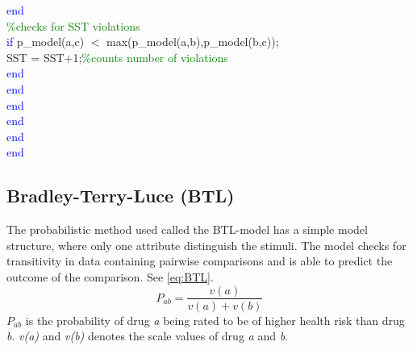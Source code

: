 {\hspace{1mm}\indent \indent \indent \indent \indent \indent \indent \textcolor{blue}{end} \\ 
\hspace{1mm}\indent \indent \indent \indent \indent\indent \indent \indent \textcolor{green}{\%checks for SST violations }\\ 
\hspace{1mm}\indent \indent \indent \indent \indent \indent \indent \indent \textcolor{blue}{if} p\_model(a,c) $<$ max(p\_model(a,b),p\_model(b,c)); \\ 
\hspace{1mm}\indent \indent \indent \indent \indent \indent \indent \indent \indent SST = SST+1;\textcolor{green}{\%counts number of violations }\\ 
\hspace{1mm}\indent \indent \indent \indent \indent \indent \indent \indent \textcolor{blue}{end} \\ 
\hspace{1mm}\indent \indent \indent \indent \indent \indent \indent \textcolor{blue}{end} \\ 
\hspace{1mm}\indent \indent \indent \indent \indent \indent \textcolor{blue}{end} \\ 
\hspace{1mm}\indent \indent \indent \indent \indent \textcolor{blue}{end} \\ 
\hspace{1mm}\indent \indent \indent \indent \textcolor{blue}{end} \\ 
\hspace{1mm}\indent \indent \indent \textcolor{blue}{end} \\ 
}

\subsection*{Bradley-Terry-Luce (BTL)}
%
The probabilistic method used called the BTL-model has a simple model structure, where only one attribute distinguish the stimuli. The model checks for transitivity in data containing pairwise comparisons and is able to predict the outcome of the comparison. See \autoref{eq:BTL}.
%
\begin{equation}
P_{ab} =\frac{v(a)}{v(a)+v(b)} 
\label{eq:BTL}
\end{equation}
%
$P_{ab}$ is the probability of drug \textit{a} being rated to be of higher health risk than drug \textit{b}. \textit{v(a)} and \textit{v(b)} denotes the scale values of drug \textit{a} and \textit{b}.

